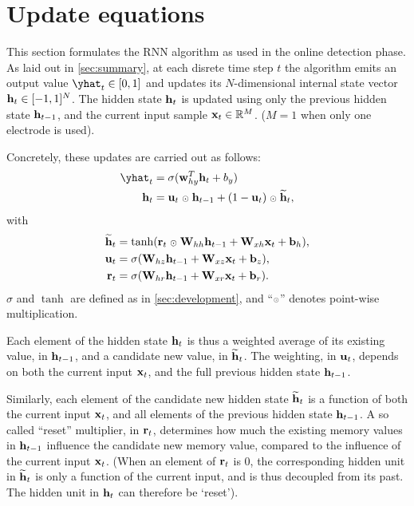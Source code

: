 \documentclass[Master_Thesis.tex]{subfiles}
\begin{document}
\section{Update equations}
\label{sec:GRU_eqs}

This section formulates the RNN algorithm as used in the online detection phase. As laid out in \cref{sec:summary}, at each disrete time step $t$ the algorithm emits an output value $\yhat_t \in [0, 1]$ and updates its $N$-dimensional internal state vector $\vb{h}_t \in [-1, 1]^{N}$. The hidden state $\vb{h}_t$ is updated using only the previous hidden state $\vb{h}_{t-1}$, and the current input sample $\vb{x}_t \in \mathbb{R}^{M}$. ($M = 1$ when only one electrode is used).

Concretely, these updates are carried out as follows:
\begin{align}
\yhat_t  &= \sigma( \vb{w}_{hy}\trans \h_t + b_y )           \label{eq:out}\\
\h_t     &= \update \had \h\prev + (1-\update) \had \hcand,  \label{eq:hnew}
\end{align}
with
\begin{align}
\hcand  &= \tanh( \reset \had \W_{hh} \h\prev 
				   + \W_{xh} \x_t + \bias_h ),  \label{eq:hcand}\\
\update &= \sigma( \W_{hz} \h\prev 
				   + \W_{xz} \x_t + \bias_z),   \label{eq:update}\\
\reset  &= \sigma( \W_{hr} \h\prev 
				   + \W_{xr} \x_t + \bias_r ).  \label{eq:reset}
\end{align}
$\sigma$ and $\tanh$ are defined as in \cref{sec:development}, and ``$\had$'' denotes point-wise multiplication.

Each element of the hidden state $\vb{h}_t$ is thus a weighted average of its existing value, in $\vb{h}_{t-1}$, and a candidate new value, in $\vb{\widetilde{h}}_t$. The weighting, in $\vb{u}_t$, depends on both the current input $\vb{x}_t$, and the full previous hidden state $\vb{h}_{t-1}$.

Similarly, each element of the candidate new hidden state $\vb{\widetilde{h}}_t$ is a function of both the current input $\vb{x}_t$, and all elements of the previous hidden state $\vb{h}_{t-1}$. A so called ``reset'' multiplier, in $\vb{r}_t$, determines how much the existing memory values in $\vb{h}_{t-1}$ influence the candidate new memory value, compared to the influence of the current input $\vb{x}_t$. (When an element of $\vb{r}_t$ is $0$, the corresponding hidden unit in $\vb{\widetilde{h}}_t$ is only a function of the current input, and is thus decoupled from its past. The hidden unit in $\vb{h}_t$ can therefore be `reset').
\end{document}
